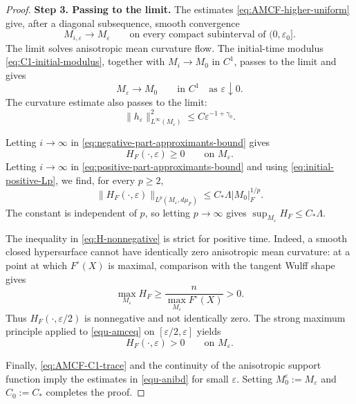 \documentclass[11pt,reqno]{amsart}
\theoremstyle{definition}
\theoremstyle{remark}
\numberwithin{equation}{section}
\begin{document}
\begin{proof}
\medskip
\noindent
\textbf{Step 3. Passing to the limit.}
The estimates \eqref{eq:AMCF-higher-uniform} give, after a diagonal subsequence, smooth convergence
\begin{equation*}
 M_{i,\varepsilon}\longrightarrow M_\varepsilon
 \qquad\text{on every compact subinterval of }(0,\varepsilon_0].
\end{equation*}
The limit solves anisotropic mean curvature flow. The initial-time modulus \eqref{eq:C1-initial-modulus}, together with $M_i\to M_0$ in $C^1$, passes to the limit and gives
\begin{equation}
\label{eq:AMCF-C1-trace}
 M_\varepsilon\longrightarrow M_0
 \qquad\text{in }C^1\quad\text{as }\varepsilon\downarrow0.
\end{equation}
The curvature estimate also passes to the limit:
\begin{equation*}
 \|h_\varepsilon\|_{L^\infty(M_\varepsilon)}^2
 \leq C\varepsilon^{-1+\gamma_0}.
\end{equation*}

Letting $i\to\infty$ in \eqref{eq:negative-part-approximants-bound} gives
\begin{equation}
\label{eq:H-nonnegative}
 H_F(\cdot,\varepsilon)\geq0
 \qquad\text{on }M_\varepsilon.
\end{equation}
Letting $i\to\infty$ in \eqref{eq:positive-part-approximants-bound} and using \eqref{eq:initial-positive-Lp}, we find, for every $p\geq2$,
\begin{equation*}
 \|H_F(\cdot,\varepsilon)\|_{L^p(M_\varepsilon,d\mu_F)}
 \leq C_*\Lambda |M_0|_F^{1/p}.
\end{equation*}
The constant is independent of $p$, so letting $p\to\infty$ gives $\sup_{M_\varepsilon}H_F\leq C_*\Lambda$. 

The inequality in \eqref{eq:H-nonnegative} is strict for positive time. Indeed, a smooth closed hypersurface cannot have identically zero anisotropic mean curvature: at a point at which $F^\circ(X)$ is maximal, comparison with the tangent Wulff shape gives
\begin{equation*}
 \max_{M_\varepsilon}H_F
 \geq\frac{n}{\max_{M_\varepsilon}F^\circ(X)}>0.
\end{equation*}
Thus $H_F(\cdot,\varepsilon/2)$ is nonnegative and not identically zero. The strong maximum principle applied to \eqref{equ-amceq} on $[\varepsilon/2,\varepsilon]$ yields
\begin{equation*}
 H_F(\cdot,\varepsilon)>0
 \qquad\text{on }M_\varepsilon.
\end{equation*}

Finally, \eqref{eq:AMCF-C1-trace} and the continuity of the anisotropic support function imply the estimates in \eqref{equ-anibd} for small $\varepsilon$. Setting $M_0^\varepsilon:=M_\varepsilon$ and $C_0:=C_*$ completes the proof.
\end{proof}
\end{document}
